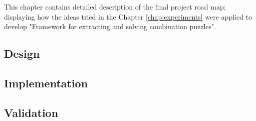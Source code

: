 \documentclass[../../main.tex]{subfiles}
\begin{document}
This chapter contains detailed description of the final project road map; displaying how the ideas tried in the Chapter \ref{chap:experiments} were applied to develop "Framework for extracting and solving combination puzzles".

\subsection{Design}


\subsection{Implementation}


\subsection{Validation}

\end{document}
